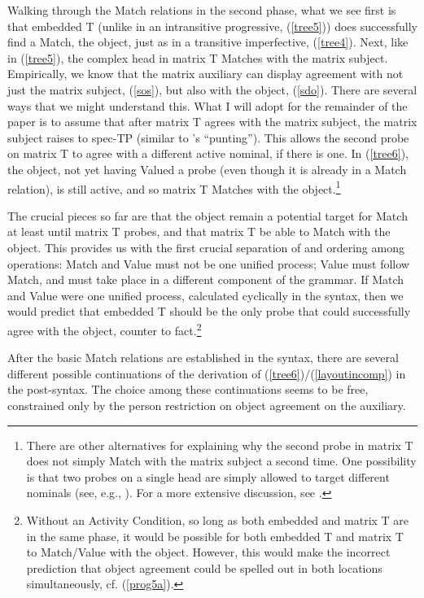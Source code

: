 \documentclass[output=paper
,modfonts
,nonflat]{langsci/langscibook}
\begin{document}
\noindent Walking through the Match relations in the second phase, what we see first is that embedded T (unlike in an intransitive progressive, (\ref{tree5})) does successfully find a Match, the object, just as in a transitive imperfective, (\ref{tree4}). Next, like in (\ref{tree5}), the complex head in matrix T Matches with the matrix subject. Empirically, we know that the matrix auxiliary can display agreement with not just the matrix subject, (\ref{sos}), but also with the object, (\ref{sdo}). There are several ways that we might understand this. What I will adopt for the remainder of the paper is to assume that after matrix T agrees with the matrix subject, the matrix subject raises to spec-TP (similar to \citealt{AnandNevins06}'s ``punting''). This allows the second probe on matrix T to agree with a different active nominal, if there is one. In (\ref{tree6}), the object, not yet having Valued a probe (even though it is already in a Match relation), is still active, and so matrix T Matches with the object.\footnote{There are other alternatives for explaining why the second probe in matrix T does not simply Match with the matrix subject a second time. One possibility is that two probes on a single head are simply allowed to target different nominals (see, e.g., \citealt{Keine10}). For a more extensive discussion, see \citet[fn. 12]{Georgi12}.} 

The crucial pieces so far are that the object remain a potential target for Match at least until matrix T probes, and that matrix T be able to Match with the object. This provides us with the first crucial separation of and ordering among operations: Match and Value must not be one unified process; Value must follow Match, and must take place in a different component of the grammar. If Match and Value were one unified process, calculated cyclically in the syntax, then we would predict that embedded T should be the only probe that could successfully agree with the object, counter to fact.\footnote{Without an Activity Condition, so long as both embedded and matrix T are in the same phase, it would be possible for both embedded T and matrix T to Match/Value with the object. However, this would make the incorrect prediction that object agreement could be spelled out in both locations simultaneously, cf. (\ref{prog5a}).}  

After the basic Match relations are established in the syntax, there are several different possible continuations of the derivation of (\ref{tree6})/(\ref{layoutincomp}) in the post-syntax. The choice among these continuations seems to be free, constrained only by the person restriction on object agreement on the auxiliary. 
\end{document}
